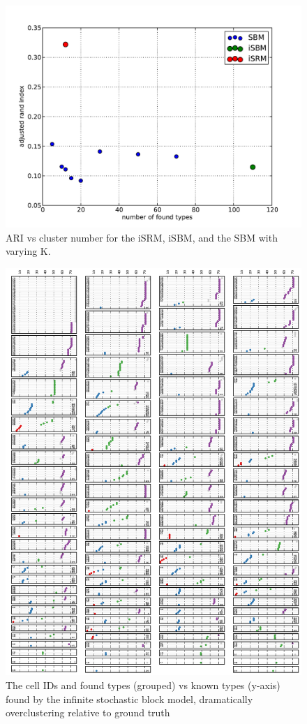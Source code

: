 \documentclass{article}
\begin{document}
\begin{figure}[h!]
  \centering 
    \centerline{\includegraphics[width=5in]{mouseretina/ari_vs_cluster.pdf}}
  \caption{ARI vs cluster number for the iSRM, iSBM, and the SBM with varying K.}
\label{fig:supp:mousecompareari}
\end{figure}

\begin{figure}[h!]
  \centering 
    \centerline{\includegraphics[width=6.0in]{mouseretina/retina.1.2.bb.0.0.data-fixed_20_100-anneal_slow_400.truth_latent.pdf}}
  \caption{The cell IDs and found types (grouped) vs known types (y-axis)  found by the infinite stochastic block model, dramatically overclustering relative to ground truth}
\label{fig:supp:retinabbclusters}
\end{figure}
\end{document}
